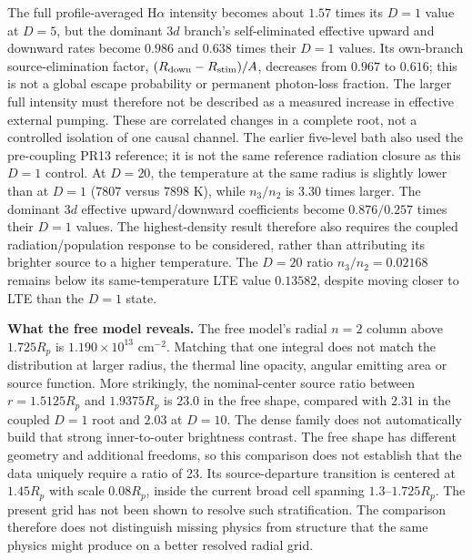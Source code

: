 The full profile-averaged H$\alpha$ intensity becomes about $1.57$ times
its $D=1$ value at $D=5$, but the dominant $3d$ branch's self-eliminated
effective upward and downward rates become $0.986$ and $0.638$ times their
$D=1$ values. Its own-branch source-elimination factor,
$(R_{\rm down}-R_{\rm stim})/A$, decreases from $0.967$ to $0.616$;
this is not a global escape probability or permanent photon-loss fraction.
The larger full intensity
must therefore not be described as a measured increase in effective external
pumping. These are correlated changes in a complete root, not a controlled
isolation of one causal channel. The earlier five-level bath also used the
pre-coupling PR13 reference; it is not the same reference radiation closure
as this $D=1$ control.
At $D=20$, the temperature at the same radius is slightly lower than at
$D=1$ ($7807$ versus $7898$ K), while $n_3/n_2$ is $3.30$ times larger.
The dominant $3d$ effective upward/downward coefficients become
$0.876/0.257$ times their $D=1$ values. The highest-density result therefore
also requires the coupled radiation/population response to be considered,
rather than attributing its brighter source to a higher temperature.
The $D=20$ ratio $n_3/n_2=0.02168$ remains below its same-temperature
LTE value $0.13582$, despite moving closer to LTE than the $D=1$ state.

\textbf{What the free model reveals.}
The free model's radial $n=2$ column above $1.725R_p$ is
$1.190\times10^{13}$ cm$^{-2}$. Matching that one integral does not match
the distribution at larger radius, the thermal line opacity, angular
emitting area or source function. More strikingly, the nominal-center source
ratio between $r=1.5125R_p$ and $1.9375R_p$ is $23.0$ in the free shape, compared with $2.31$
in the coupled $D=1$ root and $2.03$ at $D=10$. The dense family does not
automatically build that strong inner-to-outer brightness contrast.
The free shape has different geometry and additional freedoms, so this
comparison does not establish that the data uniquely require a ratio of 23.
Its source-departure transition is centered at $1.45R_p$ with scale
$0.08R_p$, inside the current broad cell spanning $1.3$--$1.725R_p$.
The present grid has not been shown to resolve such stratification. The
comparison therefore does not distinguish missing physics from structure
that the same physics might produce on a better resolved radial grid.

